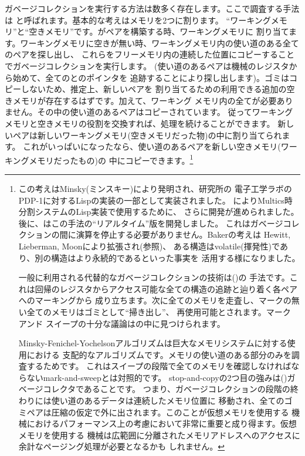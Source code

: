 ガベージコレクションを実行する方法は数多く存在します。ここで調査する手法は
と呼ばれます。基本的な考えはメモリを2つに割ります。
``ワーキングメモリ''と``空きメモリ''です。がペアを構築する時、ワーキングメモリに
割り当てます。ワーキングメモリに空きが無い時、ワーキングメモリ内の使い道のある全てのペアを探し出し、
これらをフリーメモリ内の連続した位置にコピーすることでガベージコレクションを実行します。
(使い道のあるペアは機械のレジスタから始めて、全てのとのポインタを
追跡することにより探し出します)。ゴミはコピーしないため、推定上、新しいペアを
割り当てるための利用できる追加の空きメモリが存在するはずです。加えて、ワーキング
メモリ内の全てが必要ありません。その中の使い道のあるペアはコピーされています。
従ってワーキングメモリと空きメモリの役割を交換すれば、処理を続けることができます。
新しいペアは新しいワーキングメモリ(空きメモリだった物)の中に割り当てられます。
これがいっぱいになったなら、使い道のあるペアを新しい空きメモリ(ワーキングメモリだったもの)の
中にコピーできます。\footnote{
この考えはMinsky(ミンスキー)により発明され、研究所の
電子工学ラボのPDP-1に対するLispの実装の一部として実装されました。
によりMultics時分割システムのLisp実装で使用するために、
さらに開発が進められました。後に、はこの手法の``リアルタイム''版を開発しました。
これはガベージコレクションの間に演算を停止する必要がありません。Bakerの考えは
Hewitt, Lieberman, Moonにより拡張され(参照)、
ある構造はvolatile(揮発性)であり、別の構造はより永続的であるといった事実を
活用する様になりました。

一般に利用される代替的なガベージコレクションの技術は()の
手法です。これは回帰のレジスタからアクセス可能な全ての構造の追跡と辿り着く各ペアへのマーキングから
成り立ちます。次に全てのメモリを走査し、マークの無い全てのメモリはゴミとして``掃き出し''、
再使用可能とされます。マーク アンド スイープの十分な議論はの中に見つけられます。

Minsky-Fenichel-Yochelsonアルゴリズムは巨大なメモリシステムに対する使用における
支配的なアルゴリズムです。メモリの使い道のある部分のみを調査するためです。
これはスイープの段階で全てのメモリを確認しなければならないmark-and-sweepとは対照的です。
stop-and-copyの2つ目の強みは()ガベージコレクタであることです。
つまり、ガベージコレクションの段階の終わりには使い道のあるデータは連続したメモリ位置に
移動され、全てのゴミペアは圧縮の仮定で外に出されます。このことが仮想メモリを使用する
機械におけるパフォーマンス上の考慮において非常に重要と成り得ます。仮想メモリを使用する
機械は広範囲に分離されたメモリアドレスへのアクセスに余計なページング処理が必要となるかも
しれません。
}

